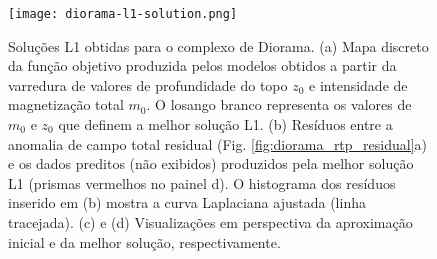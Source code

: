\pagebreak
\begin{figure}[!htb]
	\texttt{[image: diorama-l1-solution.png]}
	\caption{Soluções L1 obtidas para o complexo de Diorama. 
		(a) Mapa discreto da função objetivo produzida pelos modelos obtidos a partir da varredura de valores de profundidade do topo $z_{0}$ e intensidade de magnetização total $m_{0}$. 
		O losango branco representa os valores de $m_{0}$ e $z_{0}$ que definem a melhor solução L1.
		(b) Resíduos entre a anomalia de campo total residual (Fig. \ref{fig:diorama_rtp_residual}a) e os dados preditos (não exibidos) produzidos pela melhor solução L1 (prismas vermelhos no painel d). 
		O histograma dos resíduos inserido em (b) mostra a curva
		Laplaciana ajustada (linha tracejada). 
		(c) e (d) Visualizações em perspectiva da aproximação inicial e da melhor solução, respectivamente.
	}
	\label{fig:diorama_l1_result}
\end{figure}